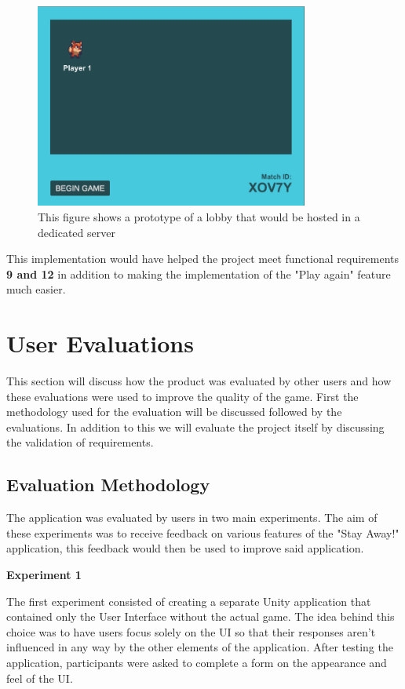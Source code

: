 \documentclass{dissertation}
\begin{document}
\begin{figure}[H]
\centering
\includegraphics[width = 9cm]{images/ded-server-lobby.png}
\caption{This figure shows a prototype of a lobby that would be hosted in a dedicated server}
\label{fig:server-lobby}
\end{figure}

This implementation would have helped the project meet functional requirements \textbf{9 and 12} in addition to making the implementation of the "Play again" feature much easier.

\section{User Evaluations}

This section will discuss how the product was evaluated by other users and how these evaluations were used to improve the quality of the game. First the methodology used for the evaluation will be discussed followed by the evaluations. In addition to this we will evaluate the project itself by discussing the validation of requirements.

\subsection{Evaluation Methodology}
The application was evaluated by users in two main experiments. The aim of these experiments was to receive feedback on various features of the "Stay Away!" application, this feedback would then be used to improve said application.

\textbf{Experiment 1}

The first experiment consisted of creating a separate Unity application that contained only the User Interface without the actual game. The idea behind this choice was to have users focus solely on the UI so that their responses aren't influenced in any way by the other elements of the application. After testing the application, participants were asked to complete a form on the appearance and feel of the UI.
\end{document}
